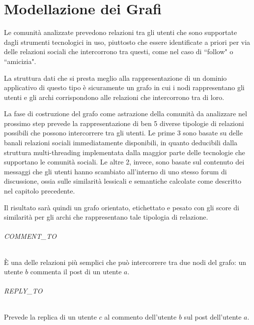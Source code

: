 \chapter{Modellazione dei Grafi}

Le comunit{\`a} analizzate prevedono relazioni tra gli utenti che sono supportate dagli strumenti tecnologici in uso, piuttosto che essere identificate a priori per via delle relazioni sociali che intercorrono tra questi, come nel caso di ``follow" o ``amicizia". 

La struttura dati che si presta meglio alla rappresentazione di un dominio applicativo di questo tipo {\`e} sicuramente un grafo in cui i nodi rappresentano gli utenti e gli archi corrispondono alle relazioni che intercorrono tra di loro.

La fase di costruzione del grafo come astrazione della comunit{\`a} da analizzare nel prossimo step prevede la rappresentazione di ben 5 diverse tipologie di relazioni possibili che possono intercorrere tra gli utenti. Le prime 3 sono basate su delle banali relazioni sociali immediatamente disponibili, in quanto deducibili dalla struttura multi-threading implementata dalla maggior parte delle tecnologie che supportano le comunit{\`a} sociali. Le altre 2, invece, sono basate sul contenuto dei messaggi che gli utenti hanno scambiato all'interno di uno stesso forum di discussione, ossia sulle similarit{\`a} lessicali e semantiche calcolate come descritto nel capitolo precedente.

Il risultato sar{\`a} quindi un grafo orientato, etichettato e pesato con gli score di similarit{\`a} per gli archi che rappresentano tale tipologia di relazione.


\subparagraph{COMMENT\_TO}
{\`E} una delle relazioni pi{\`u} semplici che pu{\`o} intercorrere tra due nodi del grafo: un utente \( b \) commenta il post di un utente \( a \). 


\subparagraph{REPLY\_TO} 
Prevede la replica di un utente \( c \) al commento dell'utente \( b \) sul post dell'utente \( a \).

